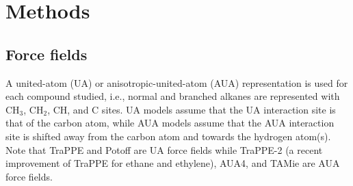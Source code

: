 \documentclass[preprint,review,12pt]{elsarticle}
\begin{document}
	
	\section{Methods} \label{Methods}
	
	\subsection{Force fields} \label{Force Field}
	
	A united-atom (UA) or anisotropic-united-atom (AUA) representation is used for each compound studied, i.e., normal and branched alkanes are represented with CH$_3$, CH$_2$, CH, and C sites. UA models assume that the UA interaction site is that of the carbon atom, while AUA models assume that the AUA interaction site is shifted away from the carbon atom and towards the hydrogen atom(s). Note that TraPPE and Potoff are UA force fields while TraPPE-2 (a recent improvement of TraPPE for ethane and ethylene), AUA4, and TAMie are AUA force fields. 
	
\end{document}
